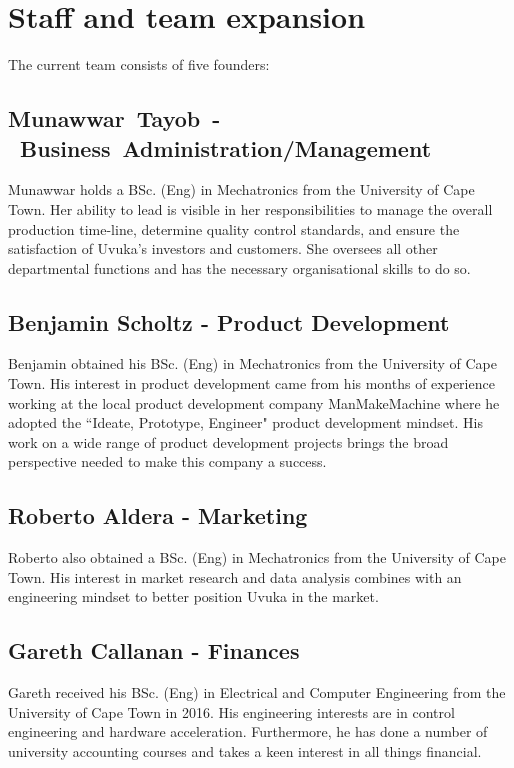 \pagebreak
\section{Staff and team expansion} 

The current team consists of five founders:
\subsection{Munawwar~Tayob~-~Business~Administration/Management}
Munawwar holds a BSc. (Eng) in Mechatronics from the University of Cape Town. Her ability to lead is visible in her responsibilities to manage the overall production time-line, determine quality control standards, and ensure the satisfaction of Uvuka's investors and customers. She oversees all other departmental functions and has the necessary organisational skills to do so.

\subsection{Benjamin Scholtz - Product Development}
Benjamin obtained his BSc. (Eng) in Mechatronics from the University of Cape Town. His interest in product development came from his months of experience working at the local product development company ManMakeMachine where he adopted the ``Ideate, Prototype, Engineer" product development mindset. His work on a wide range of product development projects brings the broad perspective needed to make this company a success.  

\subsection{Roberto Aldera - Marketing}
Roberto also obtained a BSc. (Eng) in Mechatronics from the University of Cape Town. His interest in market research and data analysis combines with an engineering mindset to better position Uvuka in the market.

\subsection{Gareth Callanan - Finances}
Gareth received his BSc. (Eng) in Electrical and Computer Engineering from the University of Cape Town in 2016. His engineering interests are in control engineering and hardware acceleration. Furthermore, he has done a number of university accounting courses and takes a keen interest in all things financial. 

